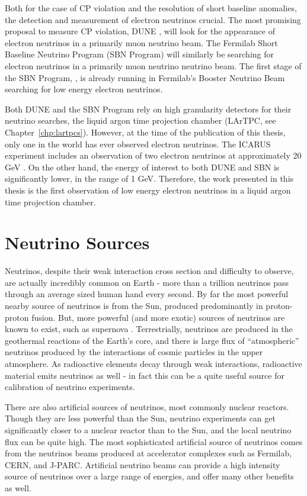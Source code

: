 Both for the case of CP violation and the resolution of short baseline anomalies, the detection and measurement of electron neutrinos crucial.  The most promising proposal to measure CP violation, DUNE \cite{Acciarri:2016ooe}, will look for the appearance of electron neutrinos in a primarily muon neutrino beam.  The Fermilab Short Baseline Neutrino Program (SBN Program) \cite{Antonello:2015lea} will similarly be searching for electron neutrinos in a primarily muon neutrino neutrino beam.  The first stage of the SBN Program, \uboone, is already running in Fermilab's Booster Neutrino Beam searching for low energy electron neutrinos.

Both DUNE and the SBN Program rely on high granularity detectors for their neutrino searches, the liquid argon time projection chamber (LArTPC, see Chapter~\ref{chp:lartpcs}).  However, at the time of the publication of this thesis, only one \lartpc in the world has ever observed electron neutrinos.  The ICARUS experiment includes an observation of two electron neutrinos at approximately 20 GeV \cite{Antonello:2013gut}.  On the other hand, the energy of interest to both DUNE and SBN is significantly lower, in the range of 1 GeV.  Therefore, the work presented in this thesis is the first observation of low energy electron neutrinos in a liquid argon time projection chamber.   

\section{Neutrino Sources}

Neutrinos, despite their weak interaction cross section and difficulty to observe, are actually incredibly common on Earth - more than a trillion neutrinos pass through an average sized human hand every second.  By far the most powerful nearby source of neutrinos is from the Sun, produced predominantly in proton-proton fusion.  But, more powerful (and more exotic) sources of neutrinos are known to exist, such as supernova \cite{Dadykin:1987ek, Hirata:1988ad}.  Terrestrially, neutrinos are produced in the geothermal reactions of the Earth's core, and there is large flux of ``atmospheric'' neutrinos produced by the interactions of cosmic particles in the upper atmosphere.  As radioactive elements decay through weak interactions, radioactive material emits neutrinos as well - in fact this can be a quite useful source for calibration of neutrino experiments.

There are also artificial sources of neutrinos, most commonly nuclear reactors.  Though they are less powerful than the Sun, neutrino experiments can get significantly closer to a nuclear reactor than to the Sun, and the local neutrino flux can be quite high.  The most sophisticated artificial source of neutrinos comes from the neutrinos beams produced at accelerator complexes such as Fermilab, CERN, and J-PARC.  Artificial neutrino beams can provide a high intensity source of neutrinos over a large range of energies, and offer many other benefits as well.  

